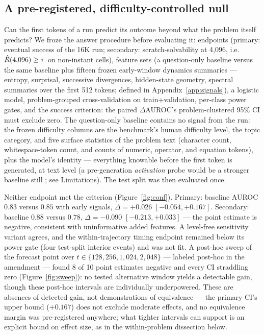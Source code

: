 
\subsection{A pre-registered, difficulty-controlled null}

Can the first tokens of a run predict its outcome beyond what the problem
itself predicts? We froze the answer procedure before evaluating it:
endpoints (primary: eventual success of the 16K run; secondary:
scratch-solvability at 4{,}096, i.e.\ $\hat{R}(4{,}096) \ge \tau$ on
non-instant cells), feature sets (a question-only baseline versus the same baseline plus
fifteen frozen early-window dynamics summaries --- entropy, surprisal,
successive divergences, hidden-state geometry, spectral summaries over the
first 512 tokens; defined in Appendix~\ref{app:signals}), a logistic model, problem-grouped cross-validation on
train+validation, per-class power gates, and the success criterion: the
paired $\Delta$AUROC's problem-clustered 95\% CI must exclude zero. The
question-only baseline contains no signal from the run: the frozen
difficulty columns are the benchmark's human difficulty level, the topic
category, and five surface statistics of the problem text (character
count, whitespace-token count, and counts of numeric, operator, and
equation tokens), plus the model's identity --- everything knowable before
the first token is generated, at text level (a pre-generation
\emph{activation} probe would be a stronger baseline still
\citep{lugoloobi2026}; see Limitations). The test split was then evaluated
once.

Neither endpoint met the criterion (Figure~\ref{fig:conf}). Primary:
baseline AUROC $0.83$ versus $0.85$ with early signals, $\Delta = +0.026$
$[-0.054, +0.167]$. Secondary: baseline $0.88$ versus $0.78$,
$\Delta = -0.090$ $[-0.213, +0.033]$ --- the point estimate is negative,
consistent with uninformative added features. A level-free
sensitivity variant agrees, and the within-trajectory timing endpoint
remained below its power gate (four test-split interior events) and was
not fit. A post-hoc sweep of the forecast point over
$t \in \{128, 256, 1{,}024, 2{,}048\}$ --- labeled post-hoc in the
amendment --- found 8 of 10 point estimates negative and every CI
straddling zero (Figure~\ref{fig:sweep}): no tested alternative window
yields a detectable gain, though these post-hoc intervals are individually
underpowered. These are absences of detected gain,
not demonstrations of equivalence --- the primary CI's upper bound
($+0.167$) does not exclude moderate effects, and no equivalence margin
was pre-registered anywhere; what tighter intervals can support is an
explicit bound on effect size, as in the within-problem dissection
below.

